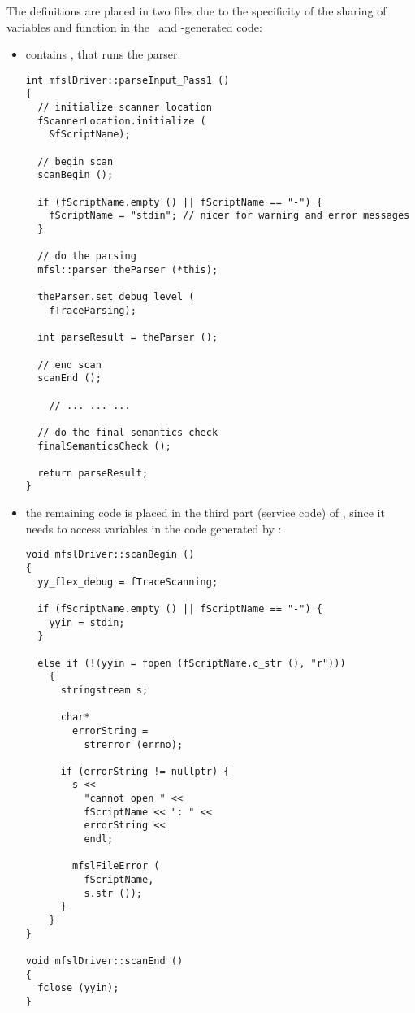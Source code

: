 The definitions are placed in two files due to the specificity of the sharing of variables and function in the \flex\ and \bison-generated code: %
\begin{itemize}

\item {} contains , that runs the parser:
\begin{lstlisting}[language=CPlusPlus]
int mfslDriver::parseInput_Pass1 ()
{
  // initialize scanner location
  fScannerLocation.initialize (
    &fScriptName);

  // begin scan
  scanBegin ();

  if (fScriptName.empty () || fScriptName == "-") {
    fScriptName = "stdin"; // nicer for warning and error messages
  }

  // do the parsing
  mfsl::parser theParser (*this);

  theParser.set_debug_level (
    fTraceParsing);

  int parseResult = theParser ();

  // end scan
  scanEnd ();

	// ... ... ...

  // do the final semantics check
  finalSemanticsCheck ();

  return parseResult;
}
\end{lstlisting}

\item the remaining code is placed in the third part (service code) of , since it needs to access variables in the code generated by \flex:
\begin{lstlisting}[language=CPlusPlus]
void mfslDriver::scanBegin ()
{
  yy_flex_debug = fTraceScanning;

  if (fScriptName.empty () || fScriptName == "-") {
    yyin = stdin;
  }

  else if (!(yyin = fopen (fScriptName.c_str (), "r")))
    {
      stringstream s;

      char*
        errorString =
          strerror (errno);

      if (errorString != nullptr) {
        s <<
          "cannot open " <<
          fScriptName << ": " <<
          errorString <<
          endl;

        mfslFileError (
          fScriptName,
          s.str ());
      }
    }
}

void mfslDriver::scanEnd ()
{
  fclose (yyin);
}
\end{lstlisting}

\end{itemize}


